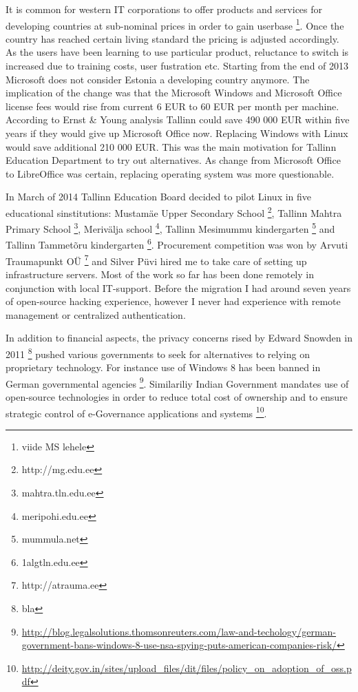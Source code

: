 \documentclass{article}
\begin{document}
It is common for western IT corporations to offer products
and services for developing countries at sub-nominal prices in order
to gain userbase
\footnote {viide MS lehele}.
Once the country has reached certain living standard the
pricing is adjusted accordingly.
As the users have been learning to use particular product,
reluctance to switch is increased due to training costs,
user fustration etc. 
Starting from the end of 2013 Microsoft does not consider Estonia a
developing country anymore. The implication of the change was that
the Microsoft Windows and Microsoft Office license fees would rise
from current 6 EUR to 60 EUR per month per machine.
According to Ernst \& Young analysis Tallinn could save 490 000 EUR
within five years if they would give up Microsoft Office now.
Replacing Windows with Linux would save additional 210 000 EUR.
\cite{ernst-young-report}
This was the main motivation for Tallinn Education Department to try
out alternatives. As change from Microsoft Office to LibreOffice was
certain, replacing operating system was more questionable.

In March of 2014 Tallinn Education Board decided
to pilot Linux in five educational sinstitutions:
Mustamäe Upper Secondary School
\footnote{http://mg.edu.ee},
Tallinn Mahtra Primary School
\footnote{mahtra.tln.edu.ee},
Merivälja school
\footnote{meripohi.edu.ee},
Tallinn Mesimummu kindergarten
\footnote{mummula.net} and
Tallinn Tammetõru kindergarten
\footnote{1algtln.edu.ee}.
Procurement competition was won by Arvuti Traumapunkt OÜ
\footnote{http://atrauma.ee} and
Silver Püvi hired me to take care of setting up infrastructure servers.
Most of the work so far has been done remotely in conjunction with
local IT-support. Before the migration I had around seven years of
open-source hacking experience, however I never had experience with
remote management or centralized authentication.

In addition to financial aspects, the privacy concerns rised by
Edward Snowden in 2011
\footnote{bla}
pushed various governments to seek for alternatives
to relying on proprietary technology.
For instance use of Windows 8 has been banned in German governmental agencies
\footnote{\url{http://blog.legalsolutions.thomsonreuters.com/law-and-techology/german-government-bans-windows-8-use-nsa-spying-puts-american-companies-risk/}}.
Similariliy Indian Government mandates use of open-source technologies
in order to reduce total cost of ownership and to ensure
strategic control of e-Governance applications and systems
\footnote{\url{http://deity.gov.in/sites/upload_files/dit/files/policy_on_adoption_of_oss.pdf}}.
\end{document}
